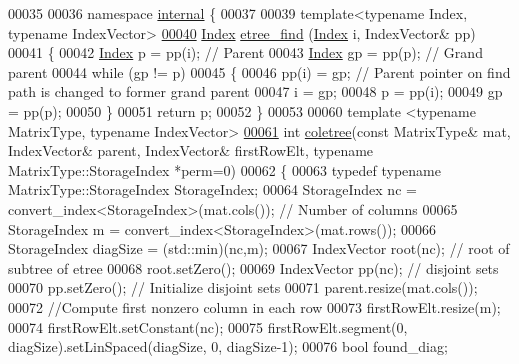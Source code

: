 \begin{DoxyCode}
00035 
00036 \textcolor{keyword}{namespace }\hyperlink{namespaceinternal}{internal} \{
00037 
00039 \textcolor{keyword}{template}<\textcolor{keyword}{typename} Index, \textcolor{keyword}{typename} IndexVector>
\hyperlink{namespace_eigen_1_1internal_af1daa938f6414254cc9a754f1ef2490b}{00040} \hyperlink{namespace_eigen_a62e77e0933482dafde8fe197d9a2cfde}{Index} \hyperlink{namespace_eigen_1_1internal_af1daa938f6414254cc9a754f1ef2490b}{etree\_find} (\hyperlink{namespace_eigen_a62e77e0933482dafde8fe197d9a2cfde}{Index} i, IndexVector& pp)
00041 \{
00042   \hyperlink{namespace_eigen_a62e77e0933482dafde8fe197d9a2cfde}{Index} p = pp(i); \textcolor{comment}{// Parent }
00043   \hyperlink{namespace_eigen_a62e77e0933482dafde8fe197d9a2cfde}{Index} gp = pp(p); \textcolor{comment}{// Grand parent }
00044   \textcolor{keywordflow}{while} (gp != p) 
00045   \{
00046     pp(i) = gp; \textcolor{comment}{// Parent pointer on find path is changed to former grand parent}
00047     i = gp; 
00048     p = pp(i);
00049     gp = pp(p);
00050   \}
00051   \textcolor{keywordflow}{return} p; 
00052 \}
00053 
00060 \textcolor{keyword}{template} <\textcolor{keyword}{typename} MatrixType, \textcolor{keyword}{typename} IndexVector>
\hyperlink{namespace_eigen_1_1internal_a86181db74ba596a7afbfd89efcc5788c}{00061} \textcolor{keywordtype}{int} \hyperlink{namespace_eigen_1_1internal_a86181db74ba596a7afbfd89efcc5788c}{coletree}(\textcolor{keyword}{const} MatrixType& mat, IndexVector& parent, IndexVector& firstRowElt, \textcolor{keyword}{typename} 
      MatrixType::StorageIndex *perm=0)
00062 \{
00063   \textcolor{keyword}{typedef} \textcolor{keyword}{typename} MatrixType::StorageIndex StorageIndex;
00064   StorageIndex nc = convert\_index<StorageIndex>(mat.cols()); \textcolor{comment}{// Number of columns}
00065   StorageIndex m = convert\_index<StorageIndex>(mat.rows());
00066   StorageIndex diagSize = (std::min)(nc,m);
00067   IndexVector root(nc); \textcolor{comment}{// root of subtree of etree }
00068   root.setZero();
00069   IndexVector pp(nc); \textcolor{comment}{// disjoint sets }
00070   pp.setZero(); \textcolor{comment}{// Initialize disjoint sets }
00071   parent.resize(mat.cols());
00072   \textcolor{comment}{//Compute first nonzero column in each row }
00073   firstRowElt.resize(m);
00074   firstRowElt.setConstant(nc);
00075   firstRowElt.segment(0, diagSize).setLinSpaced(diagSize, 0, diagSize-1);
00076   \textcolor{keywordtype}{bool} found\_diag;

\end{DoxyCode}
